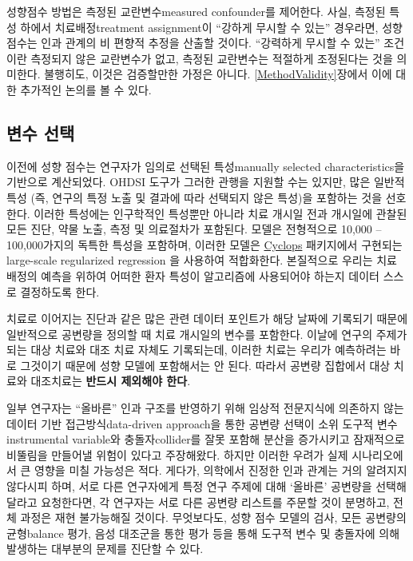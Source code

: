 \documentclass[10.5pt]{book}
\theoremstyle{definition}
\theoremstyle{definition}
\theoremstyle{definition}
\theoremstyle{remark}
\let\BeginKnitrBlock\begin \let\EndKnitrBlock\end
\begin{document}
성향점수 방법은 측정된 교란변수measured confounder를 제어한다. 사실,
측정된 특성 하에서 치료배정treatment assignment이 ``강하게 무시할 수
있는'' 경우라면, 성향 점수는 인과 관계의 비 편향적 추정을 산출할 것이다.
``강력하게 무시할 수 있는'' 조건이란 측정되지 않은 교란변수가 없고,
측정된 교란변수는 적절하게 조정된다는 것을 의미한다. 불행히도, 이것은
검증할만한 가정은 아니다. \ref{MethodValidity}장에서 이에 대한 추가적인
논의를 볼 수 있다. 

\subsection{변수 선택}\label{VariableSelection}

이전에 성향 점수는 연구자가 임의로 선택된 특성manually selected
characteristics을 기반으로 계산되었다. OHDSI 도구가 그러한 관행을 지원할
수는 있지만, 많은 일반적 특성 (즉, 연구의 특정 노출 및 결과에 따라
선택되지 않은 특성)을 포함하는 것을 선호한다. \citep{tian_2018} 이러한
특성에는 인구학적인 특성뿐만 아니라 치료 개시일 전과 개시일에 관찰된
모든 진단, 약물 노출, 측정 및 의료절차가 포함된다. 모델은 전형적으로
10,000 -- 100,000가지의 독특한 특성을 포함하며, 이러한 모델은
\href{https://ohdsi.github.io/Cyclops/}{Cyclops} 패키지에서 구현되는
large-scale regularized regression \citep{suchard_2013} 을 사용하여
적합화한다. 본질적으로 우리는 치료 배정의 예측을 위하여 어떠한 환자
특성이 알고리즘에 사용되어야 하는지 데이터 스스로 결정하도록 한다.

\BeginKnitrBlock{rmdimportant}
치료로 이어지는 진단과 같은 많은 관련 데이터 포인트가 해당 날짜에
기록되기 때문에 일반적으로 공변량을 정의할 때 치료 개시일의 변수를
포함한다. 이날에 연구의 주제가 되는 대상 치료와 대조 치료 자체도
기록되는데, 이러한 치료는 우리가 예측하려는 바로 그것이기 때문에 성향
모델에 포함해서는 안 된다. 따라서 공변량 집합에서 대상 치료와 대조치료는
\textbf{반드시 제외해야 한다}.
\EndKnitrBlock{rmdimportant}

일부 연구자는 ``올바른'' 인과 구조를 반영하기 위해 임상적 전문지식에
의존하지 않는 데이터 기반 접근방식data-driven approach을 통한 공변량
선택이 소위 도구적 변수instrumental variable와 충돌자collider를 잘못
포함해 분산을 증가시키고 잠재적으로 비뚤림을 만들어낼 위험이 있다고
주장해왔다. \citep{hernan_2002} 하지만 이러한 우려가 실제 시나리오에서
큰 영향을 미칠 가능성은 적다. \citep{schneeweiss_2018} 게다가, 의학에서
진정한 인과 관계는 거의 알려지지 않다시피 하며, 서로 다른 연구자에게
특정 연구 주제에 대해 `올바른' 공변량을 선택해 달라고 요청한다면, 각
연구자는 서로 다른 공변량 리스트를 주문할 것이 분명하고, 전체 과정은
재현 불가능해질 것이다. 무엇보다도, 성향 점수 모델의 검사, 모든 공변량의
균형balance 평가, 음성 대조군을 통한 평가 등을 통해 도구적 변수 및
충돌자에 의해 발생하는 대부분의 문제를 진단할 수 있다.
 
\end{document}
